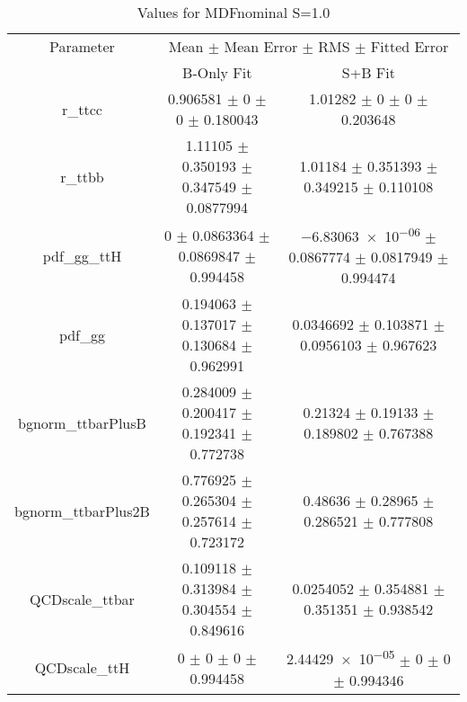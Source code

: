 \begin{table}
\centering
\caption{Values for MDFnominal S=1.0}
\begin{tabular}{ccc}
\toprule
Parameter & \multicolumn{2}{c}{Mean $\pm$ Mean Error $\pm$ RMS $\pm$ Fitted Error}\\
 & B-Only Fit & S+B Fit\\
\midrule
r\_ttcc & \num{0.906581} $\pm$ \num{0} $\pm$ \num{0} $\pm$ \num{0.180043} & \num{1.01282} $\pm$ \num{0} $\pm$ \num{0} $\pm$ \num{0.203648}\\
r\_ttbb & \num{1.11105} $\pm$ \num{0.350193} $\pm$ \num{0.347549} $\pm$ \num{0.0877994} & \num{1.01184} $\pm$ \num{0.351393} $\pm$ \num{0.349215} $\pm$ \num{0.110108}\\
pdf\_gg\_ttH & \num{0} $\pm$ \num{0.0863364} $\pm$ \num{0.0869847} $\pm$ \num{0.994458} & \num{-6.83063e-06} $\pm$ \num{0.0867774} $\pm$ \num{0.0817949} $\pm$ \num{0.994474}\\
pdf\_gg & \num{0.194063} $\pm$ \num{0.137017} $\pm$ \num{0.130684} $\pm$ \num{0.962991} & \num{0.0346692} $\pm$ \num{0.103871} $\pm$ \num{0.0956103} $\pm$ \num{0.967623}\\
bgnorm\_ttbarPlusB & \num{0.284009} $\pm$ \num{0.200417} $\pm$ \num{0.192341} $\pm$ \num{0.772738} & \num{0.21324} $\pm$ \num{0.19133} $\pm$ \num{0.189802} $\pm$ \num{0.767388}\\
bgnorm\_ttbarPlus2B & \num{0.776925} $\pm$ \num{0.265304} $\pm$ \num{0.257614} $\pm$ \num{0.723172} & \num{0.48636} $\pm$ \num{0.28965} $\pm$ \num{0.286521} $\pm$ \num{0.777808}\\
QCDscale\_ttbar & \num{0.109118} $\pm$ \num{0.313984} $\pm$ \num{0.304554} $\pm$ \num{0.849616} & \num{0.0254052} $\pm$ \num{0.354881} $\pm$ \num{0.351351} $\pm$ \num{0.938542}\\
QCDscale\_ttH & \num{0} $\pm$ \num{0} $\pm$ \num{0} $\pm$ \num{0.994458} & \num{2.44429e-05} $\pm$ \num{0} $\pm$ \num{0} $\pm$ \num{0.994346}\\
\bottomrule
\end{tabular}
\end{table}